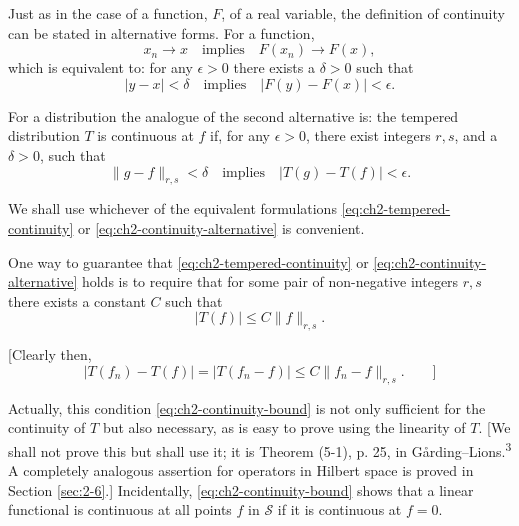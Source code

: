 Just as in the case of a function, $F$, of a real variable, the definition of
continuity can be stated in alternative forms. For a function,
\begin{equation*}
  x_n\to x\quad\text{implies}\quad F(x_n)\to F(x),
\end{equation*}
which is equivalent to: for any $\epsilon>0$ there exists a $\delta>0$ such
that
\begin{equation*}
  |y-x|<\delta\quad\text{implies}\quad |F(y)-F(x)|<\epsilon.
\end{equation*}

For a distribution the analogue of the second alternative is: the tempered
distribution $T$ is continuous at $f$ if, for any $\epsilon>0$, there exist
integers $r,s$, and a $\delta>0$, such that
\begin{equation}
  \|g-f\|_{r,s}<\delta\quad\text{implies}\quad
  |T(g)-T(f)|<\epsilon.
\tag{2-9}\label{eq:ch2-continuity-alternative}
\end{equation}

We shall use whichever of the equivalent formulations \eqref{eq:ch2-tempered-continuity} or \eqref{eq:ch2-continuity-alternative} is
convenient.

One way to guarantee that \eqref{eq:ch2-tempered-continuity} or \eqref{eq:ch2-continuity-alternative} holds is to require that for some
pair of non-negative integers $r,s$ there exists a constant $C$ such that
\begin{equation}
  |T(f)|\le C\|f\|_{r,s}.
\tag{2-10}\label{eq:ch2-continuity-bound}
\end{equation}

[Clearly then,
\begin{equation*}
  |T(f_n)-T(f)|=|T(f_n-f)|\le C\|f_n-f\|_{r,s}.\qquad]
\end{equation*}

Actually, this condition \eqref{eq:ch2-continuity-bound} is not only sufficient for the continuity of
$T$ but also necessary, as is easy to prove using the linearity of $T$.
[We shall not prove this but shall use it; it is Theorem (5-1), p. 25, in
G\aa rding--Lions.\textsuperscript{3} A completely analogous assertion for operators in
Hilbert space is proved in Section \ref{sec:2-6}.] Incidentally, \eqref{eq:ch2-continuity-bound} shows that a
linear functional is continuous at all points $f$ in $\mathcal{S}$ if it is
continuous at $f=0$.

